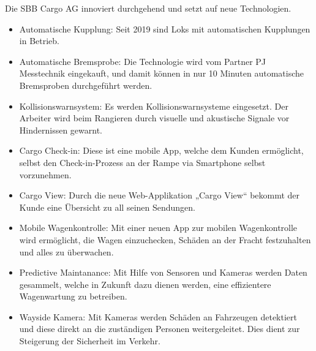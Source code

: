 \documentclass{article}
\begin{document}
Die SBB Cargo AG innoviert durchgehend und setzt auf neue Technologien.
\begin{itemize}
    \item Automatische Kupplung: Seit 2019 sind Loks mit automatischen Kupplungen in Betrieb.
    \item Automatische Bremsprobe: Die Technologie wird vom Partner PJ Messtechnik eingekauft, und damit können in nur 10 Minuten automatische Bremsproben durchgeführt werden.
    \item Kollisionswarnsystem: Es werden Kollisionswarnsysteme eingesetzt. Der Arbeiter wird beim Rangieren durch visuelle und akustische Signale vor Hindernissen gewarnt.
    \item Cargo Check-in: Diese ist eine mobile App, welche dem Kunden ermöglicht, selbst den Check-in-Prozess an der Rampe via Smartphone selbst vorzunehmen.
    \item Cargo View: Durch die neue Web-Applikation „Cargo View“ bekommt der Kunde eine Übersicht zu all seinen Sendungen.
    \item Mobile Wagenkontrolle: Mit einer neuen App zur mobilen Wagenkontrolle wird ermöglicht, die Wagen einzuchecken, Schäden an der Fracht festzuhalten und alles zu überwachen.
    \item Predictive Maintanance: Mit Hilfe von Sensoren und Kameras werden Daten gesammelt, welche in Zukunft dazu dienen werden, eine effizientere Wagenwartung zu betreiben.
    \item Wayside Kamera: Mit Kameras werden Schäden an Fahrzeugen detektiert und diese direkt an die zuständigen Personen weitergeleitet. Dies dient zur Steigerung der Sicherheit im Verkehr.
\end{itemize}
\parencite[o. S.]{innovation}

\cleardoublepage
\end{document}
